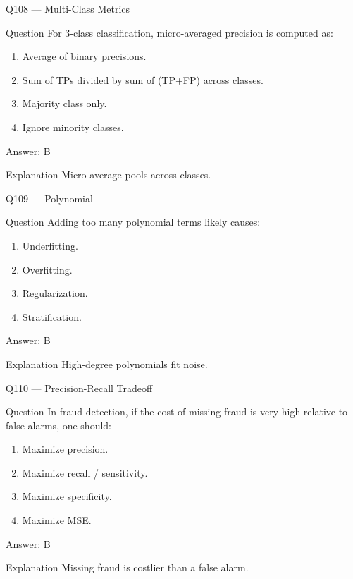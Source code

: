 \documentclass[aspectratio=169,8pt]{beamer}
\begin{document}
	\begin{frame}{Q108 --- Multi-Class Metrics}
		\begin{block}{Question}
			For 3-class classification, micro-averaged precision is computed as:
		\end{block}
		\begin{enumerate}
			\item Average of binary precisions.
			\item Sum of TPs divided by sum of (TP+FP) across classes.
			\item Majority class only.
			\item Ignore minority classes.
		\end{enumerate}
		\begin{exampleblock}{Answer: B}\end{exampleblock}
		\begin{block}{Explanation}
			Micro-average pools across classes.
		\end{block}
	\end{frame}
	
	\begin{frame}{Q109 --- Polynomial}
		\begin{block}{Question}
			Adding too many polynomial terms likely causes:
		\end{block}
		\begin{enumerate}
			\item Underfitting.
			\item Overfitting.
			\item Regularization.
			\item Stratification.
		\end{enumerate}
		\begin{exampleblock}{Answer: B}\end{exampleblock}
		\begin{block}{Explanation}
			High-degree polynomials fit noise.
		\end{block}
	\end{frame}
	
	\begin{frame}{Q110 --- Precision-Recall Tradeoff}
		\begin{block}{Question}
			In fraud detection, if the cost of missing fraud is very high relative to false alarms, one should:
		\end{block}
		\begin{enumerate}
			\item Maximize precision.
			\item Maximize recall / sensitivity.
			\item Maximize specificity.
			\item Maximize MSE.
		\end{enumerate}
		\begin{exampleblock}{Answer: B}\end{exampleblock}
		\begin{block}{Explanation}
			Missing fraud is costlier than a false alarm.
		\end{block}
	\end{frame}
	
\end{document}
